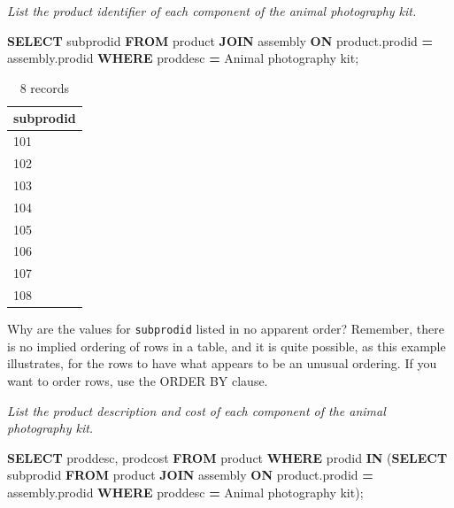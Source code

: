 \documentclass[
]{article}
\newenvironment{Shaded}{\begin{snugshade}}{\end{snugshade}}
\newcommand{\KeywordTok}[1]{\textcolor[rgb]{0.13,0.29,0.53}{\textbf{#1}}}
\newcommand{\NormalTok}[1]{#1}
\newcommand{\OperatorTok}[1]{\textcolor[rgb]{0.81,0.36,0.00}{\textbf{#1}}}
\newcommand{\StringTok}[1]{\textcolor[rgb]{0.31,0.60,0.02}{#1}}
\begin{document}
\emph{List the product identifier of each component of the animal photography
kit.}

\begin{Shaded}
\begin{Highlighting}[]
\KeywordTok{SELECT}\NormalTok{ subprodid }\KeywordTok{FROM}\NormalTok{ product }\KeywordTok{JOIN}\NormalTok{ assembly}
    \KeywordTok{ON}\NormalTok{ product.prodid }\OperatorTok{=}\NormalTok{ assembly.prodid}
    \KeywordTok{WHERE}\NormalTok{ proddesc }\OperatorTok{=} \StringTok{\textquotesingle{}Animal photography kit\textquotesingle{}}\NormalTok{;}
\end{Highlighting}
\end{Shaded}

\begin{table}

\caption{\label{tab:unnamed-chunk-88}8 records}
\centering
\begin{tabular}[t]{l}
\hline
subprodid\\
\hline
101\\
\hline
102\\
\hline
103\\
\hline
104\\
\hline
105\\
\hline
106\\
\hline
107\\
\hline
108\\
\hline
\end{tabular}
\end{table}

Why are the values for \texttt{subprodid} listed in no apparent order?
Remember, there is no implied ordering of rows in a table, and it is
quite possible, as this example illustrates, for the rows to have what
appears to be an unusual ordering. If you want to order rows, use the
ORDER BY clause.

\emph{List the product description and cost of each component of the animal
photography kit.}

\begin{Shaded}
\begin{Highlighting}[]
\KeywordTok{SELECT}\NormalTok{ proddesc, prodcost }\KeywordTok{FROM}\NormalTok{ product}
    \KeywordTok{WHERE}\NormalTok{ prodid }\KeywordTok{IN}
\NormalTok{        (}\KeywordTok{SELECT}\NormalTok{ subprodid }\KeywordTok{FROM}\NormalTok{ product }\KeywordTok{JOIN}\NormalTok{ assembly}
                \KeywordTok{ON}\NormalTok{ product.prodid }\OperatorTok{=}\NormalTok{ assembly.prodid}
                \KeywordTok{WHERE}\NormalTok{ proddesc }\OperatorTok{=} \StringTok{\textquotesingle{}Animal photography kit\textquotesingle{}}\NormalTok{);}
\end{Highlighting}
\end{Shaded}
\end{document}
